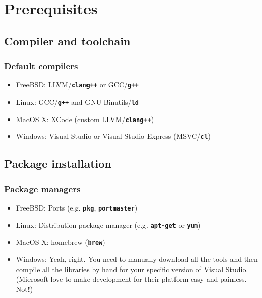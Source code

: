 \documentclass{beamer}
\newcommand{\cmd}[1]{\textbf{\texttt{#1}}}
\begin{document}
\section{Prerequisites}
\subsection{Compiler and toolchain}

\begin{frame}
  \frametitle{Default compilers}
  \begin{itemize}
  \item FreeBSD: LLVM/\cmd{clang++} or GCC/\cmd{g++}
  \item Linux: GCC/\cmd{g++} and GNU Binutils/\cmd{ld}
  \item MacOS X: XCode (custom LLVM/\cmd{clang++})
  \item Windows: Visual Studio or Visual Studio Express (MSVC/\cmd{cl})
  \end{itemize}
\end{frame}

\subsection{Package installation}
\begin{frame}
  \frametitle{Package managers}
  \begin{itemize}
  \item FreeBSD: Ports (e.g. \cmd{pkg}, \cmd{portmaster})
  \item Linux: Distribution package manager (e.g. \cmd{apt-get} or \cmd{yum})
  \item MacOS X: homebrew (\cmd{brew})
  \item Windows: Yeah, right.  You need to manually download all the
    tools and then compile all the libraries by hand for your specific
    version of Visual Studio.  (Microsoft love to make development for
    their platform easy and painless.  Not!)
  \end{itemize}
\end{frame}
\end{document}
